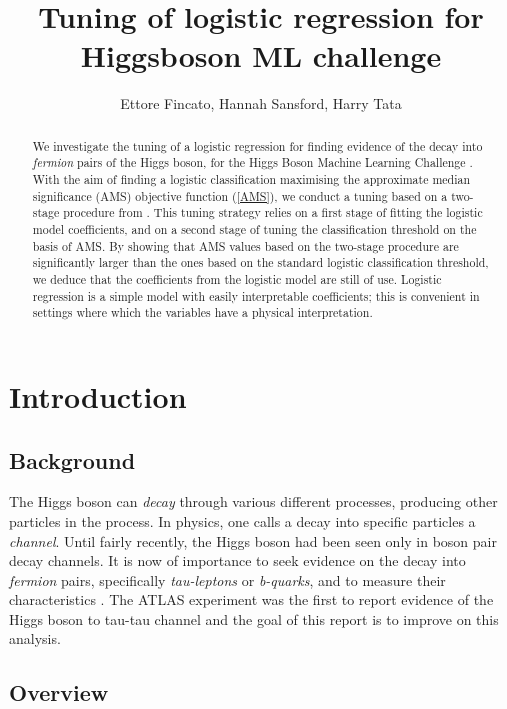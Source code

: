 \documentclass[]{article}
\title{Tuning of logistic regression for Higgsboson ML challenge}
\author{Ettore Fincato, Hannah Sansford, Harry Tata}
\begin{document}
\maketitle

\begin{abstract}

We investigate the tuning of a logistic regression for finding evidence of the decay into \textit{fermion} pairs of the Higgs boson, for the Higgs Boson Machine Learning Challenge \cite{higgs-challenge}. With the aim of finding a logistic classification maximising the approximate median significance (AMS) objective function (\ref{AMS}), we conduct a tuning based on a two-stage procedure from \cite{kotlowski2014consistent}. This tuning strategy relies on a first stage of fitting the logistic model coefficients, and on a second stage of tuning the classification threshold on the basis of AMS. By showing that AMS values based on the two-stage procedure are significantly larger than the ones based on the standard logistic classification threshold, we deduce that the coefficients from the logistic model are still of use. Logistic regression is a simple model with easily interpretable coefficients; this is convenient in settings where which the variables have a physical interpretation.

\end{abstract}

\section{Introduction}

\subsection{Background}

The Higgs boson can \textit{decay} through various different processes, producing other particles in the process. In physics, one calls a decay into specific particles a \textit{channel}. Until fairly recently, the Higgs boson had been seen only in boson pair decay channels. It is now of importance to seek evidence on the decay into \textit{fermion} pairs, specifically \textit{tau-leptons} or \textit{b-quarks}, and to measure their characteristics \cite{higgs-challenge}. The ATLAS experiment \cite{ATLAS-experiment} was the first to report evidence of the Higgs boson to tau-tau channel and the goal of this report is to improve on this analysis.


\subsection{Overview}
\end{document}
